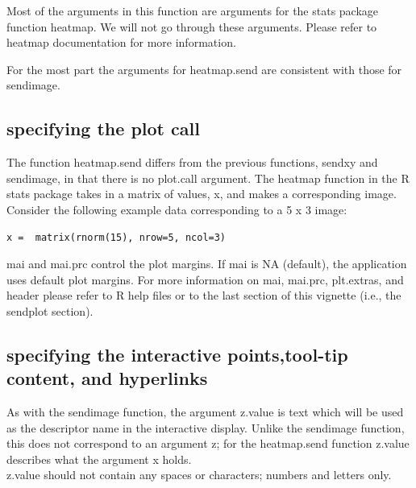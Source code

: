 \documentclass[]{article}
\begin{document}
 Most of the arguments in this function are arguments for the stats package function heatmap. We will not go through these arguments. Please refer to heatmap documentation for more information. \newline

For the most part the arguments for heatmap.send are consistent with those for sendimage.


\subsection{specifying the plot call}

The function heatmap.send differs from the previous functions, sendxy and sendimage, in that there is no plot.call argument. The heatmap function in the R stats package takes in a matrix of values, x,  and makes a corresponding image. Consider the following example data corresponding to a 5 x 3 image: 

\begin{verbatim}
x =  matrix(rnorm(15), nrow=5, ncol=3)
\end{verbatim}


\indent mai and mai.prc control the plot margins. If mai is NA (default), the application uses default plot margins. For more information on mai, mai.prc, plt.extras, and header please refer to R help files or to the last section of this vignette (i.e., the sendplot section). \newline


\subsection{specifying the interactive points,tool-tip content, and hyperlinks}

As with the sendimage function, the argument z.value is text which will be used as the descriptor name in the interactive display. Unlike the sendimage function, this does not correspond to an argument z; for the heatmap.send function z.value describes what the argument x holds. \\

 z.value should not contain any spaces or characters; numbers and letters only.\\
\end{document}
